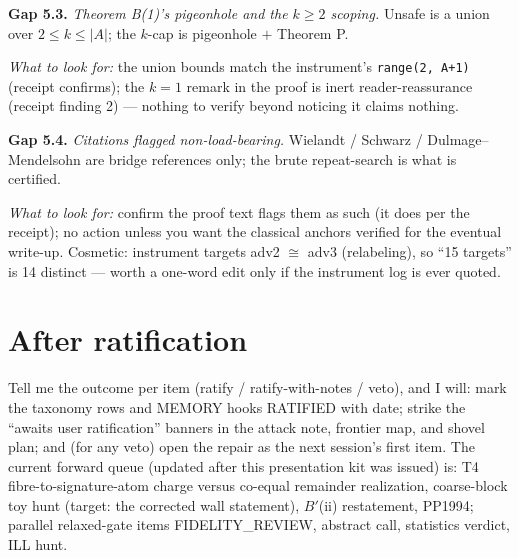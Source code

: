\documentclass[11pt]{article}
\newcommand{\gap}[1]{\medskip\noindent\textbf{Gap #1.}}
\newcommand{\lookfor}{\par\smallskip\noindent\emph{What to look for:} }
\begin{document}
\gap{5.3} \emph{Theorem B(1)'s pigeonhole and the $k \ge 2$ scoping.}
Unsafe is a union over $2 \le k \le |A|$; the $k$-cap is pigeonhole
$+$ Theorem P.
\lookfor the union bounds match the instrument's
\texttt{range(2, A+1)} (receipt confirms); the $k = 1$ remark in the
proof is inert reader-reassurance (receipt finding 2) --- nothing to
verify beyond noticing it claims nothing.

\gap{5.4} \emph{Citations flagged non-load-bearing.} Wielandt /
Schwarz / Dulmage--Mendelsohn are bridge references only; the brute
repeat-search is what is certified.
\lookfor confirm the proof text flags them as such (it does per the
receipt); no action unless you want the classical anchors verified for
the eventual write-up. Cosmetic: instrument targets adv2 $\cong$ adv3
(relabeling), so ``15 targets'' is 14 distinct --- worth a one-word
edit only if the instrument log is ever quoted.

\section*{After ratification}

Tell me the outcome per item (ratify / ratify-with-notes / veto), and
I will: mark the taxonomy rows and MEMORY hooks RATIFIED with date;
strike the ``awaits user ratification'' banners in the attack note,
frontier map, and shovel plan; and (for any veto) open the repair as
the next session's first item. The current forward queue (updated after
this presentation kit was issued) is: T4 fibre-to-signature-atom charge
versus co-equal remainder realization, coarse-block toy
hunt (target: the corrected wall statement), $B'$(ii) restatement,
PP1994; parallel
relaxed-gate items FIDELITY\_REVIEW, abstract call, statistics
verdict, ILL hunt.
\end{document}
